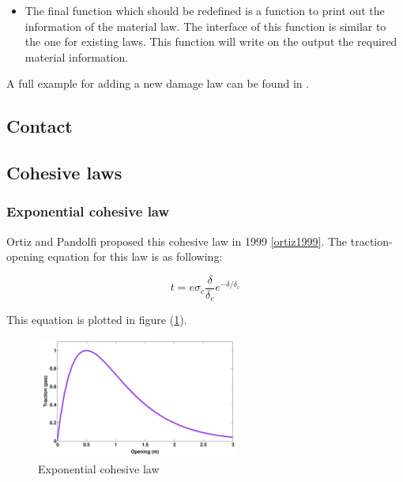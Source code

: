 \begin{itemize}

\item {} The final function which should be redefined is a
  function to print out the information of the material law. The interface of
  this function is similar to the one for existing laws. This function will
  write on the output the required material information.
\end{itemize}

A full example for adding a new damage law can be found in
.


\subsection{Contact }

\subsection{Cohesive laws}

\subsubsection{Exponential cohesive law}

Ortiz and Pandolfi proposed this cohesive law in 1999 \ref{ortiz1999}.  The
traction-opening equation for this law is as following:

\begin{equation}
  \label{eq:exponential_law}
  t = e \sigma_c \frac{\delta}{\delta_c}e^{-\delta/ \delta_c}
\end{equation}


This equation is plotted in figure (\ref{fig:smm:CL:ECL}).

 \begin{figure}[!htb]
    \begin{center}
      \includegraphics[width=0.6\textwidth,keepaspectratio=true]{figures/cohesive_exponential.pdf}
      \caption{Exponential cohesive law}
      \label{fig:smm:CL:ECL}
    \end{center}
  \end{figure}



